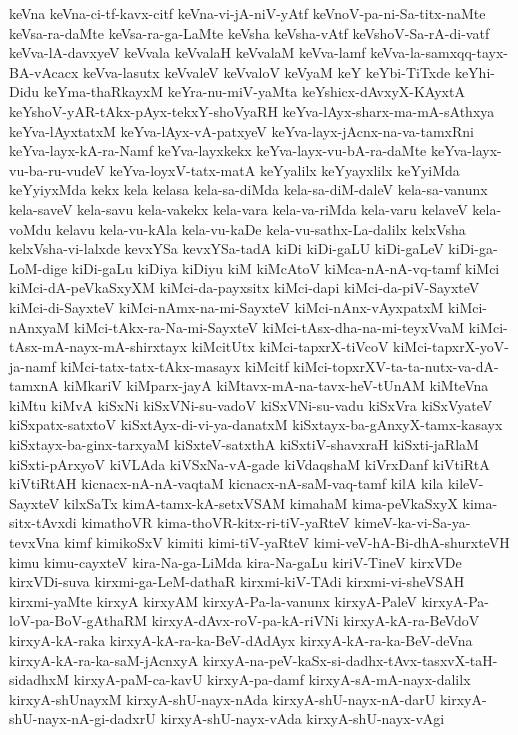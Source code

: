 {keVna
keVna-ci-tf-kavx-citf
keVna-vi-jA-niV-yAtf
keVnoV-pa-ni-Sa-titx-naMte
keVsa-ra-daMte
keVsa-ra-ga-LaMte
keVsha
keVsha-vAtf
keVshoV-Sa-rA-di-vatf
keVva-lA-davxyeV
keVvala
keVvalaH
keVvalaM
keVva-lamf
keVva-la-samxqq-tayx-BA-vAcacx
keVva-lasutx
keVvaleV
keVvaloV
keVyaM
keY
keYbi-TiTxde
keYhi-Didu
keYma-thaRkayxM
keYra-nu-miV-yaMta
keYshicx-dAvxyX-KAyxtA
keYshoV-yAR-tAkx-pAyx-tekxY-shoVyaRH
keYva-lAyx-sharx-ma-mA-sAthxya
keYva-lAyxtatxM
keYva-lAyx-vA-patxyeV
keYva-layx-jAcnx-na-va-tamxRni
keYva-layx-kA-ra-Namf
keYva-layxkekx
keYva-layx-vu-bA-ra-daMte
keYva-layx-vu-ba-ru-vudeV
keYva-loyxV-tatx-matA
keYyalilx
keYyayxlilx
keYyiMda
keYyiyxMda
kekx
kela
kelasa
kela-sa-diMda
kela-sa-diM-daleV
kela-sa-vanunx
kela-saveV
kela-savu
kela-vakekx
kela-vara
kela-va-riMda
kela-varu
kelaveV
kela-voMdu
kelavu
kela-vu-kAla
kela-vu-kaDe
kela-vu-sathx-La-dalilx
kelxVsha
kelxVsha-vi-lalxde
kevxYSa
kevxYSa-tadA
kiDi
kiDi-gaLU
kiDi-gaLeV
kiDi-ga-LoM-dige
kiDi-gaLu
kiDiya
kiDiyu
kiM
kiMcAtoV
kiMca-nA-nA-vq-tamf
kiMci
kiMci-dA-peVkaSxyXM
kiMci-da-payxsitx
kiMci-dapi
kiMci-da-piV-SayxteV
kiMci-di-SayxteV
kiMci-nAmx-na-mi-SayxteV
kiMci-nAnx-vAyxpatxM
kiMci-nAnxyaM
kiMci-tAkx-ra-Na-mi-SayxteV
kiMci-tAsx-dha-na-mi-teyxVvaM
kiMci-tAsx-mA-nayx-mA-shirxtayx
kiMcitUtx
kiMci-tapxrX-tiVcoV
kiMci-tapxrX-yoV-ja-namf
kiMci-tatx-tatx-tAkx-masayx
kiMcitf
kiMci-topxrXV-ta-ta-nutx-va-dA-tamxnA
kiMkariV
kiMparx-jayA
kiMtavx-mA-na-tavx-heV-tUnAM
kiMteVna
kiMtu
kiMvA
kiSxNi
kiSxVNi-su-vadoV
kiSxVNi-su-vadu
kiSxVra
kiSxVyateV
kiSxpatx-satxtoV
kiSxtAyx-di-vi-ya-danatxM
kiSxtayx-ba-gAnxyX-tamx-kasayx
kiSxtayx-ba-ginx-tarxyaM
kiSxteV-satxthA
kiSxtiV-shavxraH
kiSxti-jaRlaM
kiSxti-pArxyoV
kiVLAda
kiVSxNa-vA-gade
kiVdaqshaM
kiVrxDanf
kiVtiRtA
kiVtiRtAH
kicnacx-nA-nA-vaqtaM
kicnacx-nA-saM-vaq-tamf
kilA
kila
kileV-SayxteV
kilxSaTx
kimA-tamx-kA-setxVSAM
kimahaM
kima-peVkaSxyX
kima-sitx-tAvxdi
kimathoVR
kima-thoVR-kitx-ri-tiV-yaRteV
kimeV-ka-vi-Sa-ya-tevxVna
kimf
kimikoSxV
kimiti
kimi-tiV-yaRteV
kimi-veV-hA-Bi-dhA-shurxteVH
kimu
kimu-cayxteV
kira-Na-ga-LiMda
kira-Na-gaLu
kiriV-TineV
kirxVDe
kirxVDi-suva
kirxmi-ga-LeM-dathaR
kirxmi-kiV-TAdi
kirxmi-vi-sheVSAH
kirxmi-yaMte
kirxyA
kirxyAM
kirxyA-Pa-la-vanunx
kirxyA-PaleV
kirxyA-Pa-loV-pa-BoV-gAthaRM
kirxyA-dAvx-roV-pa-kA-riVNi
kirxyA-kA-ra-BeVdoV
kirxyA-kA-raka
kirxyA-kA-ra-ka-BeV-dAdAyx
kirxyA-kA-ra-ka-BeV-deVna
kirxyA-kA-ra-ka-saM-jAcnxyA
kirxyA-na-peV-kaSx-si-dadhx-tAvx-tasxvX-taH-sidadhxM
kirxyA-paM-ca-kavU
kirxyA-pa-damf
kirxyA-sA-mA-nayx-dalilx
kirxyA-shUnayxM
kirxyA-shU-nayx-nAda
kirxyA-shU-nayx-nA-darU
kirxyA-shU-nayx-nA-gi-dadxrU
kirxyA-shU-nayx-vAda
kirxyA-shU-nayx-vAgi
}
